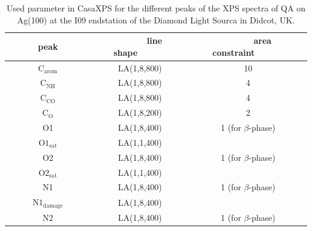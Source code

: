\begin{table}[H]
	\centering
	\caption{Used parameter in CasaXPS\autocite{CasaSoftwareLtd2022} for the different peaks of the \ac{XPS} spectra of \ac{QA} on Ag(100) at the I09 endstation of the Diamond Light Sourca in Didcot, UK.}
\begin{tabular}{|c|c|c|}
	\hline
	~~~~~~peak~~~~~~ & ~~~~~~line shape~~~~~~ & ~~~~~~area constraint~~~~~~ \\
	\hline
	$\mathrm{C_{arom}}$ & LA(1,8,800) & 10 \\
	\hline
	$\mathrm{C_{NH}}$ & LA(1,8,800) & 4 \\
	\hline
	$\mathrm{C_{CO}}$ & LA(1,8,800) & 4 \\
	\hline
	$\mathrm{C_{O}}$ & LA(1,8,200) & 2 \\
	\hline \hline
	O1 & LA(1,8,400) & 1 (for $\beta$-phase) \\
	\hline
	$\mathrm{O1_{sat}}$ & LA(1,1,400) &  \\
	\hline
	O2 & LA(1,8,400) & 1 (for $\beta$-phase) \\
	\hline
	$\mathrm{O2_{sat}}$  & LA(1,1,400) &  \\
	\hline \hline
	N1 & LA(1,8,400) & 1 (for $\beta$-phase) \\
	\hline
	$\mathrm{N1_{damage}}$  & LA(1,8,400) &  \\
	\hline
	N2 & LA(1,8,400) & 1 (for $\beta$-phase) \\
	\hline
\end{tabular}
	\label{tab:casa}
\end{table}

\cleardoublepage
